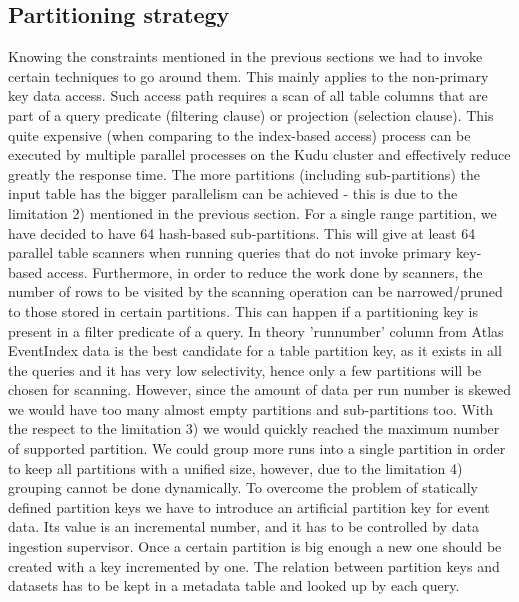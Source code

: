 \documentclass{webofc}
\begin{document}
\begin{linenumbers}
\subsection{Partitioning strategy}
\label{sec-5-part}
Knowing the constraints mentioned in the previous sections we had to invoke certain techniques to go around them. \newline
This mainly applies to the non-primary key data access. Such access path requires a scan of all table columns that are part of a query predicate (filtering clause) or projection (selection clause). This quite expensive  (when comparing to the index-based access) process can be executed by multiple parallel processes on the Kudu cluster and effectively reduce greatly the response time. The more partitions (including sub-partitions) the input table has the bigger parallelism can be achieved - this is due to the limitation 2) mentioned in the previous section. For a single range partition, we have decided to have 64 hash-based sub-partitions. This will give at least 64 parallel table scanners when running queries that do not invoke primary key-based access. \newline    
Furthermore, in order to reduce the work done by scanners, the number of rows to be visited by the scanning operation can be narrowed/pruned to those stored in certain partitions. This can happen if a partitioning key is present in a filter predicate of a query. In theory 'runnumber' column from Atlas EventIndex data is the best candidate for a table partition key, as it exists in all the queries and it has very low selectivity, hence only a few partitions will be chosen for scanning. However, since the amount of data per run number is skewed we would have too many almost empty partitions and sub-partitions too. With the respect to the limitation 3) we would quickly reached the maximum number of supported partition. We could group more runs into a single partition in order to keep all partitions with a unified size, however, due to the limitation 4) grouping cannot be done dynamically. To overcome the problem of statically defined partition keys we have to introduce an artificial partition key for event data. Its value is an incremental number, and it has to be controlled by data ingestion supervisor. Once a certain partition is big enough a new one should be created with a key incremented by one. The relation between partition keys and datasets has to be kept in a metadata table and looked up by each query.

\end{linenumbers}
\end{document}
